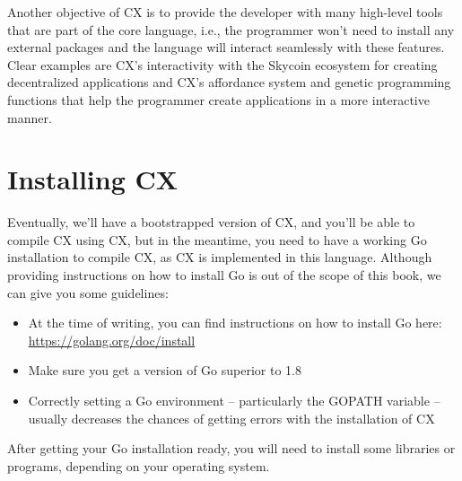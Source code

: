 \documentclass[11pt,fleqn,openany]{book} %
\begin{document}
Another objective of CX is to provide the developer with many high-level tools that are part of the core language, i.e., the programmer won't need to install any external packages and the language will interact seamlessly with these features. Clear examples are CX's interactivity with the Skycoin ecosystem for creating decentralized applications and CX's affordance system and genetic programming functions that help the programmer create applications in a more interactive manner.

\section{Installing CX}


Eventually, we'll have a bootstrapped version of CX, and you'll be able to compile CX using CX, but in the meantime, you need to have a working Go  installation to compile CX, as CX is implemented in this language. Although providing instructions on how to install Go is out of the scope of this book, we can give you some guidelines:

\begin{itemize}
\item At the time of writing, you can find instructions on how to install Go here: \url{https://golang.org/doc/install}
\item Make sure you get a version of Go superior to 1.8
\item Correctly setting a Go environment -- particularly the GOPATH variable -- usually decreases the chances of getting errors with the installation of CX
\end{itemize}

After getting your Go installation ready, you will need to install some libraries or programs, depending on your operating system.
\end{document}
